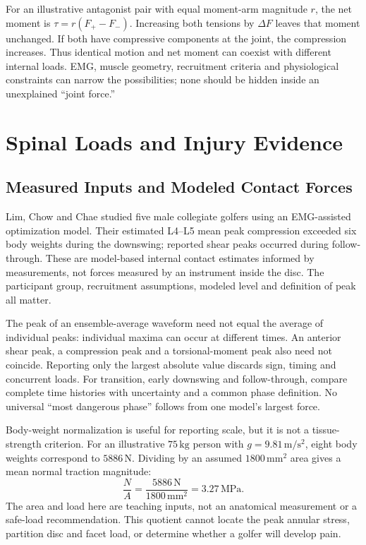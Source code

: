 For an illustrative antagonist pair with equal moment-arm magnitude $r$, the net moment is $\tau=r(F_+-F_-)$. Increasing both tensions by $\Delta F$ leaves that moment unchanged. If both have compressive components at the joint, the compression increases. Thus identical motion and net moment can coexist with different internal loads. EMG, muscle geometry, recruitment criteria and physiological constraints can narrow the possibilities; none should be hidden inside an unexplained ``joint force.''

\section{Spinal Loads and Injury Evidence}
\label{sec:spinal_loading}

\subsection{Measured Inputs and Modeled Contact Forces}
Lim, Chow and Chae studied five male collegiate golfers using an EMG-assisted optimization model. Their estimated L4--L5 mean peak compression exceeded six body weights during the downswing; reported shear peaks occurred during follow-through. These are model-based internal contact estimates informed by measurements, not forces measured by an instrument inside the disc. The participant group, recruitment assumptions, modeled level and definition of peak all matter. \citep{Lim2012LumbarLoads}

The peak of an ensemble-average waveform need not equal the average of individual peaks: individual maxima can occur at different times. An anterior shear peak, a compression peak and a torsional-moment peak also need not coincide. Reporting only the largest absolute value discards sign, timing and concurrent loads. For transition, early downswing and follow-through, compare complete time histories with uncertainty and a common phase definition. No universal ``most dangerous phase'' follows from one model's largest force.

Body-weight normalization is useful for reporting scale, but it is not a tissue-strength criterion. For an illustrative $75\,\mathrm{kg}$ person with $g=9.81\,\mathrm{m/s^2}$, eight body weights correspond to $5886\,\mathrm{N}$. Dividing by an assumed $1800\,\mathrm{mm^2}$ area gives a mean normal traction magnitude:
\begin{equation}
\frac{N}{A}=\frac{5886\,\mathrm{N}}{1800\,\mathrm{mm^2}}
=3.27\,\mathrm{MPa}.
\end{equation}
The area and load here are teaching inputs, not an anatomical measurement or a safe-load recommendation. This quotient cannot locate the peak annular stress, partition disc and facet load, or determine whether a golfer will develop pain.

